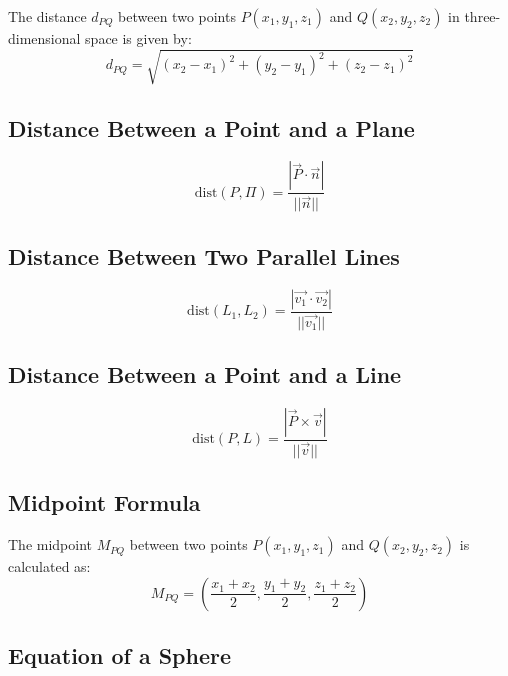 The distance \(d_{PQ}\) between two points \( P(x_1, y_1, z_1) \) and \( Q(x_2, y_2, z_2) \) in three-dimensional space is given by:
\begin{equation}\label{Distance Between Two Points}
    d_{PQ} = \sqrt{(x_2 - x_1)^2 + (y_2 - y_1)^2 + (z_2 - z_1)^2}
\end{equation}

\subsection{Distance Between a Point and a Plane}
\begin{equation} \label{Distance Between a Point and a Plane}
    \text{dist}(P, \Pi) = \dfrac{|\vec{P} \cdot \vec{n}|}{||\vec{n}||}
\end{equation}

\subsection{Distance Between Two Parallel Lines}
\begin{equation} \label{Distance Between Two Parallel Lines}
    \text{dist}(L_1, L_2) = \dfrac{|\vec{v_1} \cdot \vec{v_2}|}{||\vec{v_1}||}
\end{equation}

\subsection{Distance Between a Point and a Line}
\begin{equation} \label{Distance Between a Point and a Line}
    \text{dist}(P, L) = \dfrac{|\vec{P} \times \vec{v}|}{||\vec{v}||}
\end{equation}

\subsection{Midpoint Formula}

The midpoint \(M_{PQ}\) between two points \( P(x_1, y_1, z_1) \) and \( Q(x_2, y_2, z_2) \) is calculated as:
\begin{equation}\label{Midpoint Formula}
    M_{PQ} = \left(\dfrac{x_1 + x_2}{2}, \dfrac{y_1 + y_2}{2}, \dfrac{z_1 + z_2}{2}\right)
\end{equation}

\subsection{Equation of a Sphere}

